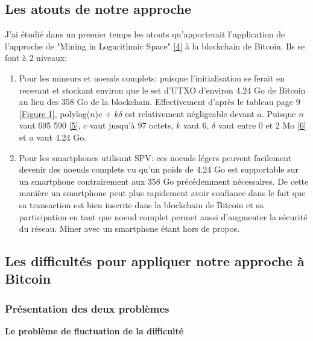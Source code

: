 \documentclass[12pt,a4paper]{article}
\newcommand{\source}[1]{\hyperlink{#1}{[#1]}}
\newcommand{\annexe}[2]{\hyperlink{#1}{[Figure #2]}}
\begin{document}
	\subsection{Les atouts de notre approche}
	
	J'ai étudié dans un premier temps les atouts qu'apporterait l'application de l'approche de "Mining in Logarithmic Space" \source{4} à la blockchain de Bitcoin. Ils se font à 2 niveaux:\\
	\begin{enumerate}
	\item Pour les mineurs et noeuds complets: puisque l'initialisation se ferait en recevant et stockant environ que le set d'UTXO d'environ 4.24 Go de Bitcoin au lieu des 358 Go de la blockchain. Effectivement d'après le tableau page 9 \annexe{21}{1}, polylog($n$)$c$ + $k\delta$ est relativement négligeable devant $a$. Puisque $n$ vaut 695 590 \source{5}, $c$ vaut jusqu'à 97 octets, $k$ vaut 6, $\delta$ vaut entre 0 et 2 Mo \source{6} et $a$ vaut 4.24 Go. %
	
	\item Pour les smartphones utilisant SPV: ces noeuds légers peuvent facilement devenir des noeuds complets vu qu'un poids de 4.24 Go est supportable sur un smartphone contrairement aux 358 Go précédemment nécessaires. De cette manière un smartphone peut plus rapidement avoir confiance dans le fait que sa transaction est bien inscrite dans la blockchain de Bitcoin et sa participation en tant que noeud complet permet aussi d'augmenter la sécurité du réseau. %
	Miner avec un smartphone étant hors de propos.
	\end{enumerate}
	
	\subsection{Les difficultés pour appliquer notre approche à Bitcoin}
	
	\subsubsection{Présentation des deux problèmes}
	
	\textbf{Le problème de fluctuation de la difficulté\\}
	
\end{document}
